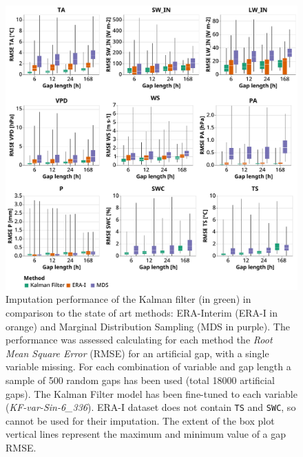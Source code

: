 \documentclass{article}
\newcommand{\imgwidth}{6in}
\begin{document}
\begin{figure}
    \centerline{\includegraphics[width=\imgwidth]{the_plot}}
\caption{ Imputation performance of the Kalman filter (in green) in comparison to the state of art methods: ERA-Interim (ERA-I in orange) and Marginal Distribution Sampling (MDS in purple). The performance was assessed calculating for each method the \textit{Root Mean Square Error} (RMSE) for an artificial gap, with a single variable missing. For each combination of variable and gap length a sample of 500 random gaps has been used (total 18000 artificial gaps).
The Kalman Filter model has been fine-tuned to each variable (\textit{KF-\textlangle var\textrangle-Sin-6\_336}). ERA-I dataset does not contain \texttt{TS} and \texttt{SWC}, so cannot be used for their imputation. The extent of the box plot vertical lines represent the maximum and minimum value of a gap RMSE.}
\label{fig:the_plot}
\end{figure}

\newcommand{\CapTheTable}{Imputation performance of the Kalman filter in comparison to the state-of-the-art
methods: ERA-Interim (ERA-I) and Marginal Distribution Sampling (MDS), using mean and standard deviation of the \textit{Root Mean Square Error} (RMSE). The best method for each gap length is highlighted in bold.}

\end{document}

